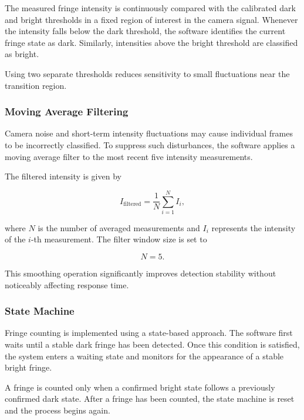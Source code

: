 The measured fringe intensity is continuously compared with the calibrated dark and bright thresholds in a fixed region of interest in the camera signal. Whenever the intensity falls below the dark threshold, the software identifies the current fringe state as dark. Similarly, intensities above the bright threshold are classified as bright.

Using two separate thresholds reduces sensitivity to small fluctuations near the transition region.

\subsubsection{Moving Average Filtering}

Camera noise and short-term intensity fluctuations may cause individual frames to be incorrectly classified. To suppress such disturbances, the software applies a moving average filter to the most recent five intensity measurements.

The filtered intensity is given by

\begin{equation}
I_{\mathrm{filtered}}
=
\frac{1}{N}
\sum_{i=1}^{N}
I_i,
\end{equation}

where \(N\) is the number of averaged measurements and \(I_i\) represents the intensity of the \(i\)-th measurement. The filter window size is set to

\begin{equation}
N = 5.
\end{equation}

This smoothing operation significantly improves detection stability without noticeably affecting response time.



\subsubsection{State Machine}

Fringe counting is implemented using a state-based approach. The software first waits until a stable dark fringe has been detected. Once this condition is satisfied, the system enters a waiting state and monitors for the appearance of a stable bright fringe.

A fringe is counted only when a confirmed bright state follows a previously confirmed dark state. After a fringe has been counted, the state machine is reset and the process begins again.

